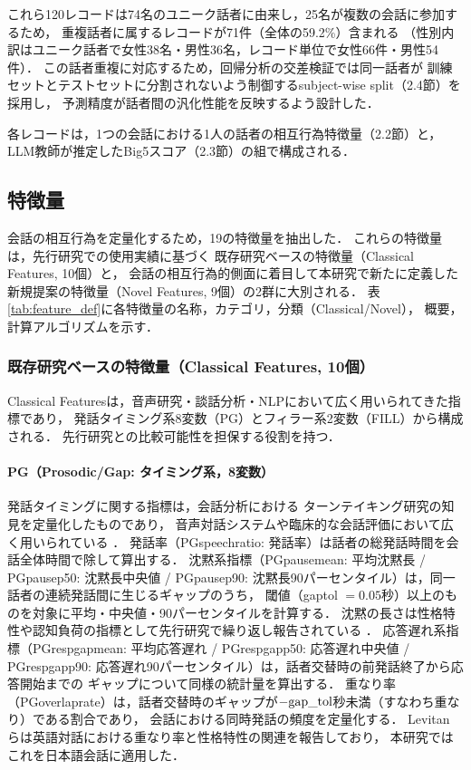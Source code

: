 \documentclass[dvipdfmx,11pt,a4paper]{bxjsarticle}
\renewcommand{\_}{\paperorigunderscore\allowbreak}%
\begin{document}
これら120レコードは74名のユニーク話者に由来し，25名が複数の会話に参加するため，
重複話者に属するレコードが71件（全体の59.2\%）含まれる
（性別内訳はユニーク話者で女性38名・男性36名，レコード単位で女性66件・男性54件）．
この話者重複に対応するため，回帰分析の交差検証では同一話者が
訓練セットとテストセットに分割されないよう制御するsubject-wise split（2.4節）を採用し，
予測精度が話者間の汎化性能を反映するよう設計した．

各レコードは，1つの会話における1人の話者の相互行為特徴量（2.2節）と，
LLM教師が推定したBig5スコア（2.3節）の組で構成される．

\subsection{特徴量}
\label{sec:features}

会話の相互行為を定量化するため，19の特徴量を抽出した．
これらの特徴量は，先行研究での使用実績に基づく
既存研究ベースの特徴量（Classical Features, 10個）と，
会話の相互行為的側面に着目して本研究で新たに定義した
新規提案の特徴量（Novel Features, 9個）の2群に大別される．
表\ref{tab:feature_def}に各特徴量の名称，カテゴリ，分類（Classical/Novel），
概要，計算アルゴリズムを示す．



\subsubsection{既存研究ベースの特徴量（Classical Features, 10個）}
\label{sec:features_classical}

Classical Featuresは，音声研究・談話分析・NLPにおいて広く用いられてきた指標であり，
発話タイミング系8変数（PG）とフィラー系2変数（FILL）から構成される．
先行研究との比較可能性を担保する役割を持つ．

\paragraph{PG（Prosodic/Gap: タイミング系，8変数）}
発話タイミングに関する指標は，会話分析における
ターンテイキング研究\cite{sacks1974}の知見を定量化したものであり，
音声対話システムや臨床的な会話評価において広く用いられている
\cite{levitan2012,deruiter2006}．
発話率（PG\_speech\_ratio: 発話率）は話者の総発話時間を会話全体時間で除して算出する．
沈黙系指標（PG\_pause\_mean: 平均沈黙長 / PG\_pause\_p50: 沈黙長中央値 / PG\_pause\_p90: 沈黙長90パーセンタイル）は，同一話者の連続発話間に生じるギャップのうち，
閾値（gap\_tol $= 0.05$秒）以上のものを対象に平均・中央値・90パーセンタイルを計算する．
沈黙の長さは性格特性や認知負荷の指標として先行研究で繰り返し報告されている
\cite{campione2002}．
応答遅れ系指標（PG\_resp\_gap\_mean: 平均応答遅れ / PG\_resp\_gap\_p50: 応答遅れ中央値 / PG\_resp\_gap\_p90: 応答遅れ90パーセンタイル）は，話者交替時の前発話終了から応答開始までの
ギャップについて同様の統計量を算出する．
重なり率（PG\_overlap\_rate）は，話者交替時のギャップが$-\text{gap\_tol}$秒未満（すなわち重なり）である割合であり，
会話における同時発話の頻度を定量化する．
Levitan ら\cite{levitan2012}は英語対話における重なり率と性格特性の関連を報告しており，
本研究ではこれを日本語会話に適用した．
\end{document}
